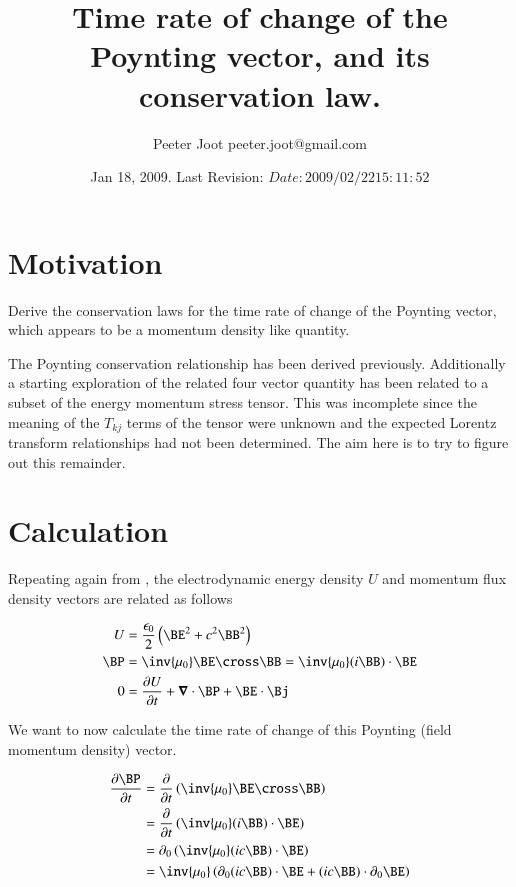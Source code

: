 \documentclass{article}
\title{ Time rate of change of the Poynting vector, and its conservation law. }
\author{Peeter Joot \quad peeter.joot@gmail.com}
\date{ Jan 18, 2009.  Last Revision: $Date: 2009/02/22 15:11:52 $ }
\begin{document}
\maketitle{}
\tableofcontents

\section{ Motivation }

Derive the conservation laws for the time rate of change of the Poynting vector, which appears to be a momentum density like quantity.

The Poynting conservation relationship has been derived previously.  Additionally a starting
exploration
\cite{PJemstresstensor}
of the related four vector quantity has been related to a subset of the energy momentum stress tensor.
This was incomplete since the meaning of the $T_{kj}$ terms of the tensor were unknown and the expected
Lorentz transform relationships had not been determined.  The aim here is to try to figure out this remainder.

\section{ Calculation }

Repeating again from \cite{PJpoynting}, the electrodynamic energy density $U$ and momentum flux density vectors are related as follows

\begin{align}\label{eqn:fromPoyntingNotes}
U &= \frac{\epsilon_0}{2}\left( \BE^2 + c^2 \BB^2 \right) \\
\BP &= \inv{\mu_0}\BE \cross \BB = \inv{\mu_0} (i \BB) \cdot \BE \\
0 &= \PD{t}{U} + \spacegrad \cdot \BP + \BE \cdot \Bj
\end{align}

We want to now calculate the time rate of change of this Poynting (field momentum density) vector.

\begin{align*}
\PD{t}{\BP}
&= \PD{t}{} \left( \inv{\mu_0} \BE \cross \BB \right) \\
&= \PD{t}{} \left( \inv{\mu_0}(i\BB) \cdot \BE \right) \\
&= \partial_0 \left( \inv{\mu_0}(i c\BB) \cdot \BE \right) \\
&= \inv{\mu_0} \left( \partial_0 (i c\BB) \cdot \BE  + (i c\BB) \cdot \partial_0 \BE  \right)
\end{align*}
\end{document}
